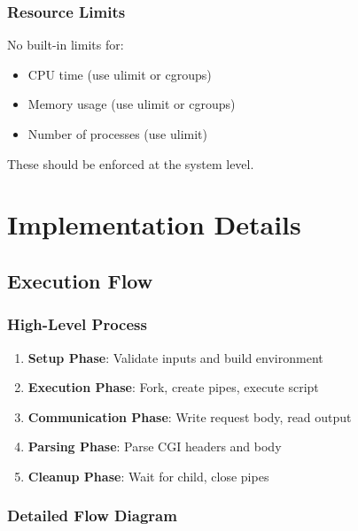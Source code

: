 \documentclass[11pt,a4paper]{article}
\begin{document}
\subsubsection{Resource Limits}

No built-in limits for:
\begin{itemize}
    \item CPU time (use ulimit or cgroups)
    \item Memory usage (use ulimit or cgroups)
    \item Number of processes (use ulimit)
\end{itemize}

These should be enforced at the system level.

\newpage
\section{Implementation Details}

\subsection{Execution Flow}

\subsubsection{High-Level Process}

\begin{enumerate}
    \item \textbf{Setup Phase}: Validate inputs and build environment
    \item \textbf{Execution Phase}: Fork, create pipes, execute script
    \item \textbf{Communication Phase}: Write request body, read output
    \item \textbf{Parsing Phase}: Parse CGI headers and body
    \item \textbf{Cleanup Phase}: Wait for child, close pipes
\end{enumerate}

\subsubsection{Detailed Flow Diagram}
\end{document}
